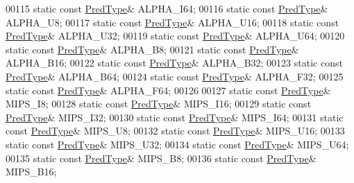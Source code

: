 \begin{DoxyCode}
00115         \textcolor{keyword}{static} \textcolor{keyword}{const} \hyperlink{class_h5_1_1_pred_type}{PredType}& ALPHA\_I64;
00116         \textcolor{keyword}{static} \textcolor{keyword}{const} \hyperlink{class_h5_1_1_pred_type}{PredType}& ALPHA\_U8;
00117         \textcolor{keyword}{static} \textcolor{keyword}{const} \hyperlink{class_h5_1_1_pred_type}{PredType}& ALPHA\_U16;
00118         \textcolor{keyword}{static} \textcolor{keyword}{const} \hyperlink{class_h5_1_1_pred_type}{PredType}& ALPHA\_U32;
00119         \textcolor{keyword}{static} \textcolor{keyword}{const} \hyperlink{class_h5_1_1_pred_type}{PredType}& ALPHA\_U64;
00120         \textcolor{keyword}{static} \textcolor{keyword}{const} \hyperlink{class_h5_1_1_pred_type}{PredType}& ALPHA\_B8;
00121         \textcolor{keyword}{static} \textcolor{keyword}{const} \hyperlink{class_h5_1_1_pred_type}{PredType}& ALPHA\_B16;
00122         \textcolor{keyword}{static} \textcolor{keyword}{const} \hyperlink{class_h5_1_1_pred_type}{PredType}& ALPHA\_B32;
00123         \textcolor{keyword}{static} \textcolor{keyword}{const} \hyperlink{class_h5_1_1_pred_type}{PredType}& ALPHA\_B64;
00124         \textcolor{keyword}{static} \textcolor{keyword}{const} \hyperlink{class_h5_1_1_pred_type}{PredType}& ALPHA\_F32;
00125         \textcolor{keyword}{static} \textcolor{keyword}{const} \hyperlink{class_h5_1_1_pred_type}{PredType}& ALPHA\_F64;
00126 
00127         \textcolor{keyword}{static} \textcolor{keyword}{const} \hyperlink{class_h5_1_1_pred_type}{PredType}& MIPS\_I8;
00128         \textcolor{keyword}{static} \textcolor{keyword}{const} \hyperlink{class_h5_1_1_pred_type}{PredType}& MIPS\_I16;
00129         \textcolor{keyword}{static} \textcolor{keyword}{const} \hyperlink{class_h5_1_1_pred_type}{PredType}& MIPS\_I32;
00130         \textcolor{keyword}{static} \textcolor{keyword}{const} \hyperlink{class_h5_1_1_pred_type}{PredType}& MIPS\_I64;
00131         \textcolor{keyword}{static} \textcolor{keyword}{const} \hyperlink{class_h5_1_1_pred_type}{PredType}& MIPS\_U8;
00132         \textcolor{keyword}{static} \textcolor{keyword}{const} \hyperlink{class_h5_1_1_pred_type}{PredType}& MIPS\_U16;
00133         \textcolor{keyword}{static} \textcolor{keyword}{const} \hyperlink{class_h5_1_1_pred_type}{PredType}& MIPS\_U32;
00134         \textcolor{keyword}{static} \textcolor{keyword}{const} \hyperlink{class_h5_1_1_pred_type}{PredType}& MIPS\_U64;
00135         \textcolor{keyword}{static} \textcolor{keyword}{const} \hyperlink{class_h5_1_1_pred_type}{PredType}& MIPS\_B8;
00136         \textcolor{keyword}{static} \textcolor{keyword}{const} \hyperlink{class_h5_1_1_pred_type}{PredType}& MIPS\_B16;

\end{DoxyCode}
